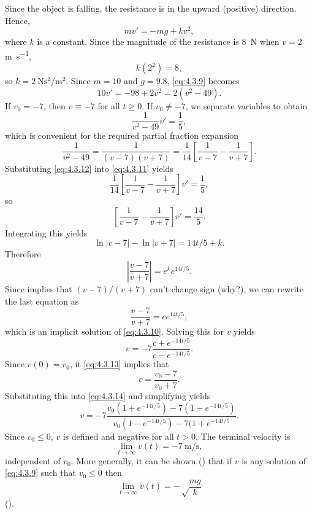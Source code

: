 \begin{solution}
Since the object is falling, the resistance is in the upward
(positive) direction. Hence,
\begin{equation} \label{eq:4.3.9}
mv'=-mg+kv^2,
\end{equation}
where $k$ is a constant. Since the magnitude of the resistance is \qty{8}{\newton}
when $v=2$ \unit{\meter\per\second},
\[
k(2^2)=8,
\]
 so $k=\qty{2}{\newton\second\squared\per\meter\squared}$.  Since
$m=10$ and $g=9.8$, \eqref{eq:4.3.9} becomes
\begin{equation} \label{eq:4.3.10}
10v'=-98+2v^2=2(v^2-49).
\end{equation}
If $v_0=-7$, then $v\equiv-7$ for all $t\ge0$. If $v_0\ne-7$,
we separate  variables to obtain
\begin{equation} \label{eq:4.3.11}
\frac{1}{v^2-49}v'=\frac{1}{5},
\end{equation}
which is convenient for the required partial fraction expansion
\begin{equation} \label{eq:4.3.12}
\frac{1}{v^2-49} =\frac{1}{(v-7)(v+7)}
=\frac{1}{14}\left[\frac{1}{v-7}
-\frac{1}{v+7}\right].
\end{equation}
 Substituting \eqref{eq:4.3.12} into \eqref{eq:4.3.11} yields
\[
\frac{1}{14}\left[\frac{1}{v-7}-\frac{1}{v+7}\right]v'=\frac{1}{5},
\]
 so
\[
\left[\frac{1}{v-7}-\frac{1}{v+7}\right]v'=\frac{14}{5}.
\]
Integrating this yields
\[
\ln |v-7|-\ln|v+7|=14t/5+k.
\]
Therefore
\[
\left|\frac{v-7}{v+7}\right|=e^ke^{14t/5}.
\]
Since    implies  that  $(v-7)/(v+7)$   can't
change sign (why?), we can rewrite the last equation as
 \begin{equation} \label{eq:4.3.13}
 \frac{v-7}{v+7}=ce^{14t/5},
\end{equation}
which is an implicit solution of \eqref{eq:4.3.10}.
Solving this for $v$ yields
\begin{equation} \label{eq:4.3.14}
v=-7\frac{c+e^{-14t/5}}{c-e^{-14t/5}}.
\end{equation}
 Since $v(0)=v_0$, it
 \eqref{eq:4.3.13} implies that
\[
c=\frac{v_0-7}{v_0+7}.
\]
 Substituting this into \eqref{eq:4.3.14} and simplifying yields
\[
v=-7\frac{v_0(1+e^{-14t/5})-7(1-e^{-14t/5})}{v_0(1-e^{-14t/5})-7(1+e^{-14t/5}}.
\]
Since $v_0\le0$, $v$ is defined and negative for all
$t>0$. The terminal velocity is
\[
\lim_{t\to\infty} v(t)=\qty{-7}{\meter\per\second},
\]
independent of $v_0$. More generally, it
can be shown () that if $v$ is any solution
of \eqref{eq:4.3.9} such that $v_0\le0$ then
\[
\lim_{t\to\infty}v(t)=-\sqrt\frac{mg}{k}
\]
().
\end{solution}


